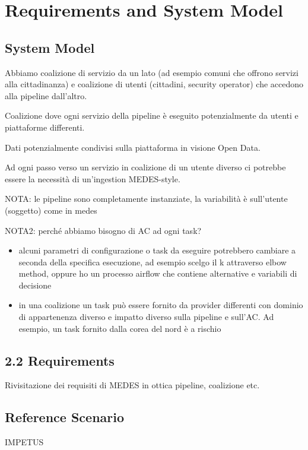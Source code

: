 \documentclass[10pt,journal,compsoc]{IEEEtran}
\begin{document}
\section{Requirements and System Model}

\subsection{System Model}



Abbiamo coalizione di servizio da un lato (ad esempio comuni che offrono servizi alla cittadinanza) e coalizione di utenti (cittadini, security operator) che accedono alla pipeline dall’altro.

Coalizione dove ogni servizio della pipeline è eseguito potenzialmente da utenti e piattaforme differenti. 

Dati potenzialmente condivisi sulla piattaforma in visione Open Data.

Ad ogni passo verso un servizio in coalizione di un utente diverso ci potrebbe essere la necessità di un’ingestion MEDES-style.

NOTA: le pipeline sono completamente instanziate, la variabilità è sull’utente (soggetto) come in medes

NOTA2: perché abbiamo bisogno di AC ad ogni task?
\begin{itemize}
    \item alcuni parametri di configurazione o task da eseguire potrebbero cambiare a seconda della specifica esecuzione, ad esempio scelgo il k attraverso elbow method, oppure ho un processo airflow che contiene alternative e variabili di decisione
    \item in una coalizione un task può essere fornito da provider differenti con dominio di appartenenza diverso e impatto diverso sulla pipeline e sull’AC. Ad esempio, un task fornito dalla corea del nord è a rischio
\end{itemize}


\subsection{2.2 Requirements}
Rivisitazione dei requisiti di MEDES in ottica pipeline, coalizione etc.

\subsection{Reference Scenario}
IMPETUS 
\end{document}
